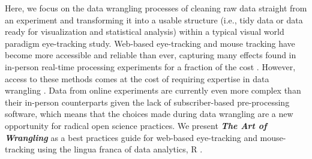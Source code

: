 Here, we focus on the data wrangling processes of cleaning raw data straight from an experiment and transforming it into a usable structure (i.e., tidy data or data ready for visualization and statistical analysis) within a typical visual world paradigm eye-tracking study. Web-based eye-tracking and mouse tracking have become more accessible and reliable than ever, capturing many effects found in in-person real-time processing experiments for a fraction of the cost \parencite[e.g.,][]{Vos_2017,Semmelmann_2017,Prystauka_Altmann_Rothman_2023,Degen_Seeing_2021}. However, access to these methods comes at the cost of requiring expertise in data wrangling \parencite[e.g., ][]{Vos_2017,Prystauka_Altmann_Rothman_2023}. Data from online experiments are currently even more complex than their in-person counterparts given the lack of subscriber-based pre-processing software, which means that the choices made during data wrangling are a new opportunity for radical open science practices. We present \textit{\textbf{The Art of Wrangling}} as a best practices guide for web-based eye-tracking and mouse-tracking using the lingua franca of data analytics, R \parencite{mizumoto_r_2015}. 
